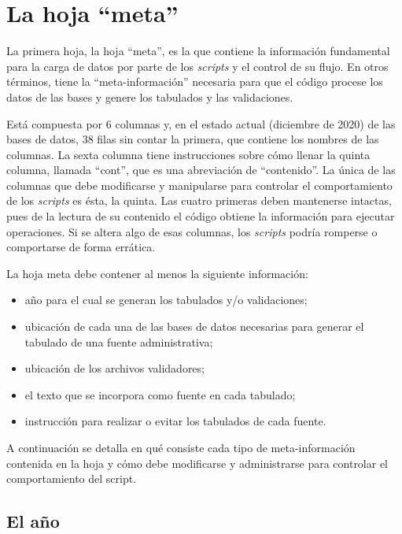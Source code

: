 \documentclass[
  spanish,
]{book}
\begin{document}
\hypertarget{la-hoja-meta}{%
\section{La hoja ``meta''}\label{la-hoja-meta}}

La primera hoja, la hoja ``meta'', es la que contiene la información fundamental para la carga de datos por parte de los \emph{scripts} y el control de su flujo. En otros términos, tiene la ``meta-información'' necesaria para que el código procese los datos de las bases y genere los tabulados y las validaciones.

Está compuesta por 6 columnas y, en el estado actual (diciembre de 2020) de las bases de datos, 38 filas sin contar la primera, que contiene los nombres de las columnas. La sexta columna tiene instrucciones sobre cómo llenar la quinta columna, llamada ``cont'', que es una abreviación de ``contenido''. La única de las columnas que debe modificarse y manipularse para controlar el comportamiento de los \emph{scripts} es ésta, la quinta. Las cuatro primeras deben mantenerse intactas, pues de la lectura de su contenido el código obtiene la información para ejecutar operaciones. Si se altera algo de esas columnas, los \emph{scripts} podría romperse o comportarse de forma errática.

La hoja meta debe contener al menos la siguiente información:

\begin{itemize}
\item
  año para el cual se generan los tabulados y/o validaciones;
\item
  ubicación de cada una de las bases de datos necesarias para generar el tabulado de una fuente administrativa;
\item
  ubicación de los archivos validadores;
\item
  el texto que se incorpora como fuente en cada tabulado;
\item
  instrucción para realizar o evitar los tabulados de cada fuente.
\end{itemize}

A continuación se detalla en qué consiste cada tipo de meta-información contenida en la hoja y cómo debe modificarse y administrarse para controlar el comportamiento del script.

\hypertarget{el-auxf1o}{%
\subsection{El año}\label{el-auxf1o}}
\end{document}
